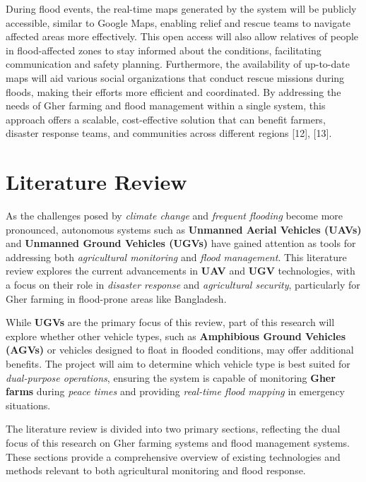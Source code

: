 \documentclass[conference]{IEEEtran}
\begin{document}
During flood events, the real-time maps generated by the system will be publicly accessible, similar to Google Maps, enabling relief and rescue teams to navigate affected areas more effectively. This open access will also allow relatives of people in flood-affected zones to stay informed about the conditions, facilitating communication and safety planning. Furthermore, the availability of up-to-date maps will aid various social organizations that conduct rescue missions during floods, making their efforts more efficient and coordinated. By addressing the needs of Gher farming and flood management within a single system, this approach offers a scalable, cost-effective solution that can benefit farmers, disaster response teams, and communities across different regions [12], [13].



\section{\textbf{Literature Review}}

As the challenges posed by \textit{climate change} and \textit{frequent flooding} become more pronounced, autonomous systems such as \textbf{Unmanned Aerial Vehicles (UAVs)} and \textbf{Unmanned Ground Vehicles (UGVs)} have gained attention as tools for addressing both \textit{agricultural monitoring} and \textit{flood management}. This literature review explores the current advancements in \textbf{UAV} and \textbf{UGV} technologies, with a focus on their role in \textit{disaster response} and \textit{agricultural security}, particularly for Gher farming in flood-prone areas like Bangladesh.

While \textbf{UGVs} are the primary focus of this review, part of this research will explore whether other vehicle types, such as \textbf{Amphibious Ground Vehicles (AGVs)} or vehicles designed to float in flooded conditions, may offer additional benefits. The project will aim to determine which vehicle type is best suited for \textit{dual-purpose operations}, ensuring the system is capable of monitoring \textbf{Gher farms} during \textit{peace times} and providing \textit{real-time flood mapping} in emergency situations.

The literature review is divided into two primary sections, reflecting the dual focus of this research on Gher farming systems and flood management systems. These sections provide a comprehensive overview of existing technologies and methods relevant to both agricultural monitoring and flood response.
\end{document}
